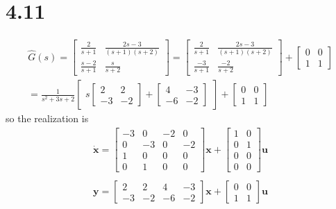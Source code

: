 \documentclass{article}
\begin{document}
\section*{4.11}
$$
\begin{aligned}
\hat{G}(s)=\begin{bmatrix}
\frac{2}{s+1} & \frac{2 s-3}{(s+1)(s+2)} \\
\frac{s-2}{s+1} & \frac{s}{s+2}
\end{bmatrix}
=\begin{bmatrix}
\frac{2}{s+1} & \frac{2 s-3}{(s+1)(s+2)} \\
\frac{-3}{s+1} & \frac{-2}{s+2}
\end{bmatrix}+\begin{bmatrix}
0 & 0 \\
1 & 1
\end{bmatrix} \\
=\frac{1}{s^{2}+3 s+2}\begin{bmatrix}
s\begin{bmatrix}
2 & 2 \\
-3 & -2
\end{bmatrix}+\begin{bmatrix}
4 & -3 \\
-6 & -2\end{bmatrix}
\end{bmatrix}+\begin{bmatrix}
0 & 0 \\
1 & 1
\end{bmatrix}
\end{aligned}
$$
so the realization is
$$
\begin{array}{l}
\dot{\pmb{x}}=\left[\begin{array}{cccc}
-3 & 0 & -2 & 0 \\
0 & -3 & 0 & -2 \\
1 & 0 & 0 & 0 \\
0 & 1 & 0 & 0
\end{array}\right] \pmb{x}+\left[\begin{array}{cc}
1 & 0 \\
0 & 1 \\
0 & 0 \\
0 & 0
\end{array}\right] \pmb{u}\\
~\\
\pmb{y}=\left[\begin{array}{cccc}
2 & 2 & 4 & -3 \\
-3 & -2 & -6 & -2
\end{array}\right] \pmb{x}+\left[\begin{array}{cc}
0 & 0 \\
1 & 1
\end{array}\right] \pmb{u}
\end{array}
$$
\end{document}
